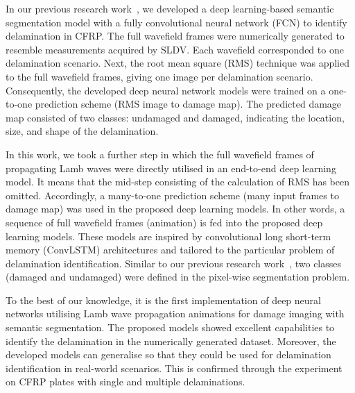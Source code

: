 In our previous research work~\cite{Ijjeh2021}, we developed a deep learning-based semantic segmentation model with a fully convolutional neural network (FCN) to identify delamination in CFRP.
The full wavefield frames were numerically generated to resemble measurements acquired by SLDV.
Each wavefield corresponded to one delamination scenario.
Next, the root mean square (RMS) technique was applied to the full wavefield frames, giving one image per delamination scenario.
Consequently, the developed deep neural network models were trained on a one-to-one prediction scheme (RMS image to damage map).
The predicted damage map consisted of two classes: undamaged and damaged, indicating the location, size, and shape of the delamination.

In this work, we took a further step in which the full wavefield frames of propagating Lamb waves were directly utilised in an end-to-end
deep learning model.
It means that the mid-step consisting of the calculation of RMS has been omitted.
Accordingly, a many-to-one prediction scheme (many input frames to damage map) was used in the proposed deep learning models.
In other words, a sequence of full wavefield frames (animation) is fed into the proposed deep learning models.
These models are inspired by convolutional long short-term memory (ConvLSTM) architectures and tailored to the particular problem of delamination identification.
Similar to our previous research work~\cite{Ijjeh2021}, two classes (damaged and undamaged) were defined in the pixel-wise segmentation problem.

To the best of our knowledge, it is the first implementation of deep neural networks utilising Lamb wave propagation animations for damage imaging with semantic segmentation. 
The proposed models showed excellent capabilities to identify the delamination in the numerically generated dataset.
Moreover, the developed models can generalise so that they could be used for delamination identification in real-world scenarios.
This is confirmed through the experiment on CFRP plates with single and multiple delaminations.
